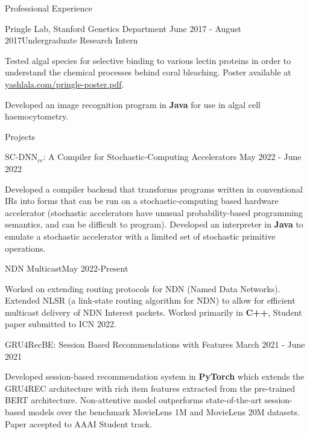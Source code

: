 \documentclass{resume} %
\begin{document}
\begin{resumeSection}{Professional Experience}
\begin{resumeSubsection}{Pringle Lab, Stanford Genetics Department}
	{June 2017 - August 2017}{Undergraduate Research Intern}{}
\item Tested algal species for selective binding to various lectin proteins in
	order to understand the chemical processes behind coral bleaching.
	Poster available at
	\href{https://yashlala.com/pringle-poster.pdf}{yashlala.com/pringle-poster.pdf}. 
\item Developed an image recognition program in \textbf{Java} for use in
	algal cell haemocytometry.
\end{resumeSubsection}

\end{resumeSection}


\begin{resumeSection}{Projects} \itemsep -10pt

\begin{resumeSubsection}
	{$\text{SC-DNN}_{cc}$: A Compiler for Stochastic-Computing Accelerators}
	{May 2022 - June 2022}{}{}
\item Developed a compiler backend that transforms programs written in
	conventional IRs into forms that can be run on a stochastic-computing
	based hardware accelerator (stochastic accelerators have unusual
	probability-based programming semantics, and can be difficult to
	program). Developed an interpreter in \textbf{Java} to emulate a
	stochastic accelerator with a limited set of stochastic primitive
	operations. 
\end{resumeSubsection}

\begin{resumeSubsection}{NDN Multicast}{May 2022-Present}{}{}
\item Worked on extending routing protocols for NDN (Named Data Networks). 
	Extended NLSR (a link-state routing algorithm for NDN) to allow for
	efficient multicast delivery of NDN Interest packets. Worked primarily
	in \textbf{C++}, Student paper submitted to ICN 2022. 
\end{resumeSubsection}

\begin{resumeSubsection}{GRU4RecBE: Session Based Recommendations with Features}
	{March 2021 - June 2021}{}{}
\item Developed session-based recommendation system in \textbf{PyTorch} which
	extends the GRU4REC architecture with rich item features extracted from
	the pre-trained BERT architecture. Non-attentive model outperforms
	state-of-the-art session-based models over the benchmark MovieLens 1M
	and MovieLens 20M datasets. Paper accepted to AAAI Student track. 
\end{resumeSubsection}


\end{resumeSection}
\end{document}
